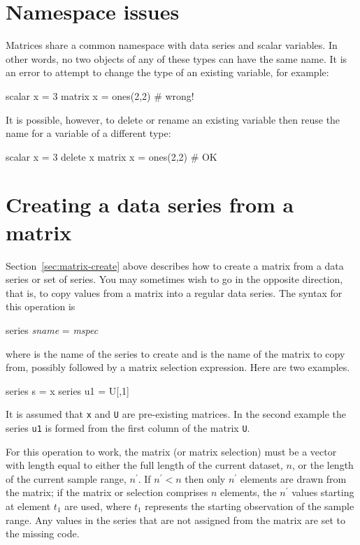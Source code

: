 \section{Namespace issues}
\label{matrix-namespace}

Matrices share a common namespace with data series and scalar
variables.  In other words, no two objects of any of these types can
have the same name.  It is an error to attempt to change the type of
an existing variable, for example:
%
\begin{code}
scalar x = 3
matrix x = ones(2,2) # wrong!
\end{code}
%
It is possible, however, to delete or rename an existing variable then
reuse the name for a variable of a different type:
\begin{code}
scalar x = 3
delete x
matrix x = ones(2,2) # OK
\end{code}


\section{Creating a data series from a matrix}
\label{matrix-create-series}

Section~\ref{sec:matrix-create} above describes how to create a matrix
from a data series or set of series.  You may sometimes wish to go in
the opposite direction, that is, to copy values from a matrix 
into a regular data series.  The syntax for this operation is
%
\begin{textcode}
series \textsl{sname} = \textsl{mspec}
\end{textcode}
%
where  is the name of the series to create and
 is the name of the matrix to copy from, possibly followed
by a matrix selection expression.  Here are two examples.
%
\begin{code}
series s = x
series u1 = U[,1]
\end{code}
%
It is assumed that \texttt{x} and \texttt{U} are pre-existing
matrices.  In the second example the series \texttt{u1} is formed from
the first column of the matrix \texttt{U}.

For this operation to work, the matrix (or matrix selection) must be a
vector with length equal to either the full length of the current
dataset, $n$, or the length of the current sample range, $n^{\prime}$.
If $n^{\prime} < n$ then only $n^{\prime}$ elements are drawn from the
matrix; if the matrix or selection comprises $n$ elements, the
$n^{\prime}$ values starting at element $t_1$ are used, where $t_1$
represents the starting observation of the sample range.  Any values
in the series that are not assigned from the matrix are set to the
missing code.


